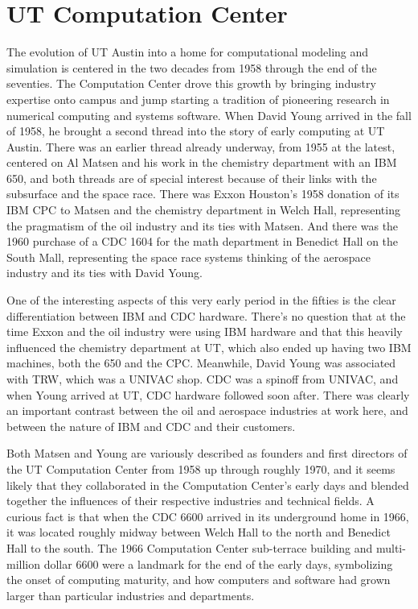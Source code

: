 \chapter{UT Computation Center}

The evolution of UT Austin into a home for computational modeling and simulation is centered in the two decades from 1958 through the end of the seventies. The Computation Center drove this growth by bringing industry expertise onto campus and jump starting a tradition of pioneering research in numerical computing and systems software. When David Young arrived in the fall of 1958, he brought a second thread into the story of early computing at UT Austin. There was an earlier thread already underway, from 1955 at the latest, centered on Al Matsen and his work in the chemistry department with an IBM 650, and both threads are of special interest because of their links with the subsurface and the space race. There was Exxon Houston’s 1958 donation of its IBM CPC to Matsen and the chemistry department in Welch Hall, representing the pragmatism of the oil industry and its ties with Matsen. And there was the 1960 purchase of a CDC 1604 for the math department in Benedict Hall on the South Mall, representing the space race systems thinking of the aerospace industry and its ties with David Young. 

One of the interesting aspects of this very early period in the fifties is the clear differentiation between IBM and CDC hardware. There’s no question that at the time Exxon and the oil industry were using IBM hardware and that this heavily influenced the chemistry department at UT, which also ended up having two IBM machines, both the 650 and the CPC. Meanwhile, David Young was associated with TRW, which was a UNIVAC shop. CDC was a spinoff from UNIVAC, and when Young arrived at UT, CDC hardware followed soon after. There was clearly an important contrast between the oil and aerospace industries at work here, and between the nature of IBM and CDC and their customers.

Both Matsen and Young are variously described as founders and first directors of the UT Computation Center from 1958 up through roughly 1970, and it seems likely that they collaborated in the Computation Center’s early days and blended together the influences of their respective industries and technical fields. A curious fact is that when the CDC 6600 arrived in its underground home in 1966, it was located roughly midway between Welch Hall to the north and Benedict Hall to the south. The 1966 Computation Center sub-terrace building and multi-million dollar 6600 were a landmark for the end of the early days, symbolizing the onset of computing maturity, and how computers and software had grown larger than particular industries and departments.

